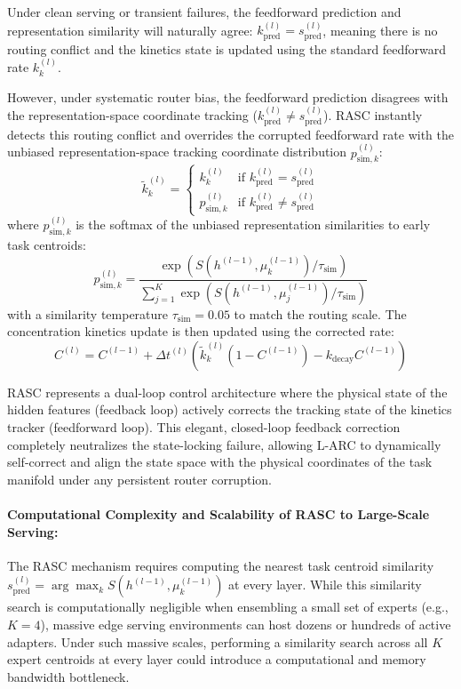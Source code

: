 Under clean serving or transient failures, the feedforward prediction and representation similarity will naturally agree: $k_{\text{pred}}^{(l)} = s_{\text{pred}}^{(l)}$, meaning there is no routing conflict and the kinetics state is updated using the standard feedforward rate $k_k^{(l)}$. 

However, under systematic router bias, the feedforward prediction disagrees with the representation-space coordinate tracking ($k_{\text{pred}}^{(l)} \ne s_{\text{pred}}^{(l)}$). RASC instantly detects this routing conflict and overrides the corrupted feedforward rate with the unbiased representation-space tracking coordinate distribution $p_{\text{sim}, k}^{(l)}$:
\begin{equation}
\tilde{k}_k^{(l)} = 
\begin{cases}
k_k^{(l)} & \text{if } k_{\text{pred}}^{(l)} = s_{\text{pred}}^{(l)} \\
p_{\text{sim}, k}^{(l)} & \text{if } k_{\text{pred}}^{(l)} \ne s_{\text{pred}}^{(l)}
\end{cases}
\label{eq:rasc_override}
\end{equation}
where $p_{\text{sim}, k}^{(l)}$ is the softmax of the unbiased representation similarities to early task centroids:
\begin{equation}
p_{\text{sim}, k}^{(l)} = \frac{\exp\left(S(h^{(l-1)}, \mu_k^{(l-1)}) / \tau_{\text{sim}}\right)}{\sum_{j=1}^K \exp\left(S(h^{(l-1)}, \mu_j^{(l-1)}) / \tau_{\text{sim}}\right)}
\end{equation}
with a similarity temperature $\tau_{\text{sim}} = 0.05$ to match the routing scale. The concentration kinetics update is then updated using the corrected rate:
\begin{equation}
C^{(l)} = C^{(l-1)} + \Delta t^{(l)} \left( \tilde{k}_k^{(l)} \left(1 - C^{(l-1)}\right) - k_{\text{decay}} C^{(l-1)} \right)
\label{eq:rasc_kinetics}
\end{equation}

RASC represents a dual-loop control architecture where the physical state of the hidden features (feedback loop) actively corrects the tracking state of the kinetics tracker (feedforward loop). This elegant, closed-loop feedback correction completely neutralizes the state-locking failure, allowing L-ARC to dynamically self-correct and align the state space with the physical coordinates of the task manifold under any persistent router corruption.

\paragraph{Computational Complexity and Scalability of RASC to Large-Scale Serving:}
The RASC mechanism requires computing the nearest task centroid similarity $s_{\text{pred}}^{(l)} = \arg\max_k S(h^{(l-1)}, \mu_k^{(l-1)})$ at every layer. While this similarity search is computationally negligible when ensembling a small set of experts (e.g., $K = 4$), massive edge serving environments can host dozens or hundreds of active adapters. Under such massive scales, performing a similarity search across all $K$ expert centroids at every layer could introduce a computational and memory bandwidth bottleneck.

